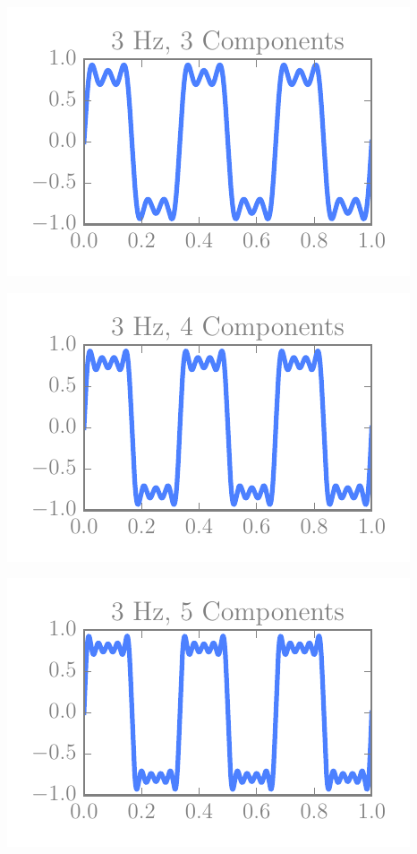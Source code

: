 \begin{multicols}{5}
\includegraphics[width=\linewidth]{../img/fouriers/3_3.pdf}

\includegraphics[width=\linewidth]{../img/fouriers/3_4.pdf}

\includegraphics[width=\linewidth]{../img/fouriers/3_5.pdf}


\end{multicols}
